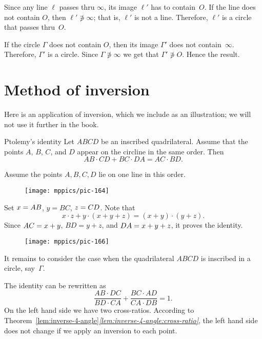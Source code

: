 Since any line $\ell$ passes thru $\infty$, its image $\ell'$ has to contain~$O$.
If the line does not contain $O$, 
then $\ell'\not\ni \infty$;
that is, $\ell'$ is not a line.
Therefore, $\ell'$ is a circle that passes thru~$O$. 

If the circle $\Gamma$ does not contain $O$, 
then its image $\Gamma'$ does not contain~$\infty$.
Therefore, $\Gamma'$ is a circle.
Since  $\Gamma\not\ni\infty$ we get that $\Gamma' \not\ni O$.
Hence the result.
\qeds

\section*{Method of inversion}

Here is an application of inversion,
which we include as an illustration;
we will not use it further in the book.

\begin{thm}{Ptolemy's identity}\label{ptolemy-id}
Let $ABCD$ be an inscribed quadrilateral.
Assume that the points $A$, $B$, $C$, and $D$ appear on the circline in the same order.
Then 
$$ AB\cdot CD+ BC\cdot DA=AC\cdot BD.$$

\end{thm}

Assume the points $A,B,C,D$ lie on one line in this order.

\begin{wrapfigure}{o}{39mm}
\centering
\texttt{[image: mppics/pic-164]}
\end{wrapfigure}

Set $x\z=AB$, $y=BC$, $z\z=CD$.
Note that
$$x\cdot z+y\cdot (x+y+z)=(x+y)\cdot(y+z).$$
Since $AC\z=x+y$, $BD=y+z$, and $DA\z=x+y+z$,
it proves the identity.

\begin{wrapfigure}{o}{39mm}
\centering
\texttt{[image: mppics/pic-166]}
\end{wrapfigure}

It remains to consider the case when the quadrilateral $ABCD$ is inscribed in a circle, say~$\Gamma$. 

The identity can be rewritten as 
$$\frac{AB\cdot DC}{ BD\cdot CA}+ \frac{BC\cdot AD}{CA\cdot DB}=1.$$
On the left hand side we have two cross-ratios.
According to Theorem~\ref{lem:inverse-4-angle}\textit{\ref{lem:inverse-4-angle:cross-ratio}}, the left hand side does not change if we apply an inversion to each point.


